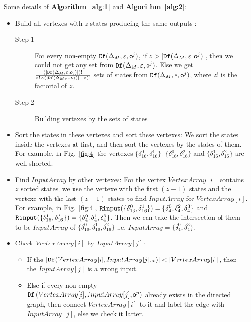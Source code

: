 Some details of {\bf Algorithm~\ref{alg:1}} and {\bf Algorithm~\ref{alg:2}}:
\begin{itemize}
\item Build all vertexes with $z$ states producing the same outputs :
\begin{description}
\item[Step 1] For every non-empty ${\tt Df}(\Delta_M,\varepsilon,\mathsf{o}^{j})$, if $z>|{\tt Df}(\Delta_M,\varepsilon,\mathsf{o}^{j})|$, then we could not get any set from ${\tt Df}(\Delta_M,\varepsilon,\mathsf{o}^{j})$. Else we get $\frac{(|{\tt Df}(\Delta_M,\varepsilon,o_j)|)!}{z!\times (|{\tt Df}(\Delta_M,\varepsilon,o_j)|-z)!}$ sets of states from ${\tt Df}(\Delta_M,\varepsilon,\mathsf{o}^{j})$, where $z!$ is the factorial of $z$.
\item[Step 2] Building vertexes by the sets of states. 
\end{description}
 \item Sort the states in these vertexes and sort these vertexes: We sort the states inside the vertexes at first, and then sort the vertexes by the states of them. For example, in Fig.~\ref{fig:4} the vertexes $\{\delta_{16}^0,\delta_{16}^1\}$, $\{\delta_{16}^0,\delta_{16}^2\}$ and $\{\delta_{16}^1,\delta_{16}^2\}$ are well shorted. 
  \item Find $InputArray$ by other vertexes:
   For the vertex $VertexArray[i]$ contains $z$ sorted states, we use the vertexe with the first $(z-1)$ states and the vertexe with the last $(z-1)$ states to find $InputArray$ for $VertexArray[i]$. For example, in Fig.~\ref{fig:4}, ${\tt Rinput}(\{\delta_{16}^0,\delta_{16}^1\})=\{\delta_{4}^0,\delta_{4}^2,\delta_{4}^3\}$ and ${\tt Rinput}(\{\delta_{16}^1,\delta_{16}^2\})=\{\delta_{4}^0,\delta_{4}^1,\delta_{4}^3\}$. Then we can take the intersection of them to be $InputArray$ of $\{\delta_{16}^0,\delta_{16}^1,\delta_{16}^2\}$ i.e. $InputArray=\{\delta_{4}^0,\delta_{4}^3\}$. 
  \item Check $VertexArray[i]$ by $InputArray[j]$:
     
\begin{itemize}
\item If the $|\Ded(VertexArray[i],InputArray[j],\varepsilon)|<|VertexArray[i]|$, then the $InputArray[j]$ is a wrong input.
\item Else if every non-empty \\${\tt Df}\left(VertexArray[i],InputArray[j],\mathsf{o}^{p}\right)$ already exists in the directed graph, then connect $VertexArray[i]$ to it and label the edge with $InputArray[j]$, else we check it latter. 
\end{itemize} 
\end{itemize} 


